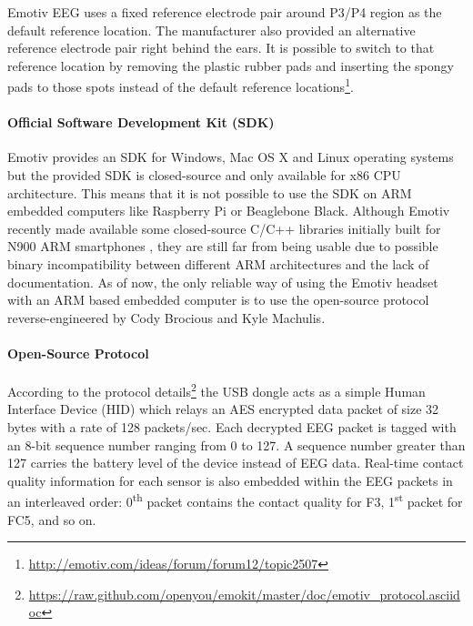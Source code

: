 \documentclass[12pt]{article}
\newcommand\mysubsubsubsection[1]{\paragraph{#1}\hspace{0pt}}
\numberwithin{equation}{section}
\numberwithin{figure}{section}
\numberwithin{table}{section}
\begin{document}
\par{
    Emotiv EEG uses a fixed reference electrode pair around P3/P4 region as the default
    reference location. The manufacturer also provided an alternative reference electrode
    pair right behind the ears. It is possible to switch to that reference location
    by removing the plastic rubber pads and inserting the spongy pads to those spots
    instead of the default reference locations\footnote{\url{http://emotiv.com/ideas/forum/forum12/topic2507}}.
}

\mysubsubsubsection{Official Software Development Kit (SDK)}

\par{
    Emotiv provides an SDK for Windows, Mac OS X and Linux operating systems but the provided SDK is
    closed-source and only available for x86 CPU architecture. This means that it is not possible
    to use the SDK on ARM embedded computers like Raspberry Pi or Beaglebone Black.
    Although Emotiv recently made available some closed-source C/C++ libraries initially
    built for N900 ARM smartphones \citep{stopczynski_smartphone_2011}, they are still far from being usable due to possible binary
    incompatibility between different ARM architectures and the lack of documentation. As of now,
    the only reliable way of using the Emotiv headset with an ARM based embedded computer is to use the
    open-source protocol reverse-engineered by Cody Brocious and Kyle Machulis.
}

\mysubsubsubsection{Open-Source Protocol}

\par{
    According to the protocol details\footnote{\url{https://raw.github.com/openyou/emokit/master/doc/emotiv_protocol.asciidoc}}
    the USB dongle acts as a simple Human Interface Device (HID) which relays an AES encrypted data packet of size 32 bytes with a rate of 128 packets/sec.
    Each decrypted EEG packet is tagged with an 8-bit sequence number ranging from 0 to 127.
    A sequence number greater than 127 carries the battery level of the device instead of EEG data.
    Real-time contact quality information for each sensor is also embedded within the EEG
    packets in an interleaved order: 0\textsuperscript{th} packet contains the contact quality for F3,
    1\textsuperscript{st} packet for FC5, and so on.
}
\end{document}
